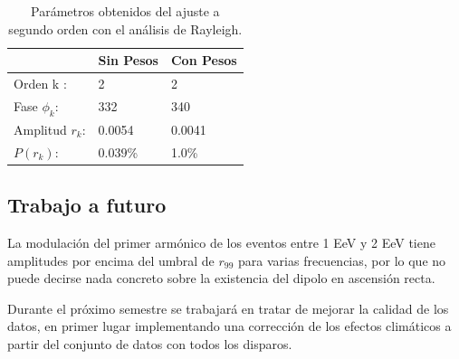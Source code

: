 		\begin{table}[H]
		\centering
			\begin{tabular}{l|l|l|}
			\cline{2-3}
			                                      & Sin Pesos 		 & Con Pesos \\ \hline
			\multicolumn{1}{|l|}{Orden k :}       & 2                & 2                    \\ \hline
			\multicolumn{1}{|l|}{Fase $\phi_k$:}  & 332              & 340                  \\ \hline
			\multicolumn{1}{|l|}{Amplitud $r_k$:} & 0.0054           & 0.0041               \\ \hline
			\multicolumn{1}{|l|}{$P(r_k)$:}       & $0.039$\%        & 1.0\%  \\ \hline
			\end{tabular}
		\caption{Parámetros obtenidos del ajuste a segundo orden con el análisis de Rayleigh.}
		\label{table:parametros_second_order}
		\end{table}

\subsection{Trabajo a futuro}


La modulación del primer armónico de los eventos entre 1 EeV y 2 EeV tiene amplitudes por encima del umbral de $r_{99}$ para varias frecuencias, por lo que no puede decirse nada concreto sobre la existencia del dipolo en ascensión recta.


Durante el próximo semestre se trabajará en tratar de mejorar la calidad de los datos, en primer lugar implementando una corrección de los efectos climáticos a partir del conjunto de datos con todos los disparos.
